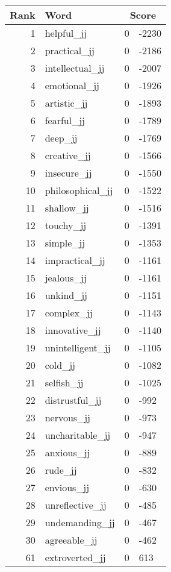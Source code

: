 \begin{longtable}[!htbp]{| rlr@{.}l |}
    \hline
    \textbf{Rank} & \textbf{Word} & \multicolumn{2}{c|}{\textbf{Score}} \\
    \hline
    \endhead
    1 & helpful\_jj & 0 & -2230 \\
    2 & practical\_jj & 0 & -2186 \\
    3 & intellectual\_jj & 0 & -2007 \\
    4 & emotional\_jj & 0 & -1926 \\
    5 & artistic\_jj & 0 & -1893 \\
    6 & fearful\_jj & 0 & -1789 \\
    7 & deep\_jj & 0 & -1769 \\
    8 & creative\_jj & 0 & -1566 \\
    9 & insecure\_jj & 0 & -1550 \\
    10 & philosophical\_jj & 0 & -1522 \\
    11 & shallow\_jj & 0 & -1516 \\
    12 & touchy\_jj & 0 & -1391 \\
    13 & simple\_jj & 0 & -1353 \\
    14 & impractical\_jj & 0 & -1161 \\
    15 & jealous\_jj & 0 & -1161 \\
    16 & unkind\_jj & 0 & -1151 \\
    17 & complex\_jj & 0 & -1143 \\
    18 & innovative\_jj & 0 & -1140 \\
    19 & unintelligent\_jj & 0 & -1105 \\
    20 & cold\_jj & 0 & -1082 \\
    21 & selfish\_jj & 0 & -1025 \\
    22 & distrustful\_jj & 0 & -992 \\
    23 & nervous\_jj & 0 & -973 \\
    24 & uncharitable\_jj & 0 & -947 \\
    25 & anxious\_jj & 0 & -889 \\
    26 & rude\_jj & 0 & -832 \\
    27 & envious\_jj & 0 & -630 \\
    28 & unreflective\_jj & 0 & -485 \\
    29 & undemanding\_jj & 0 & -467 \\
    30 & agreeable\_jj & 0 & -462 \\
    61 & extroverted\_jj & 0 & 613 \\

\end{longtable}
